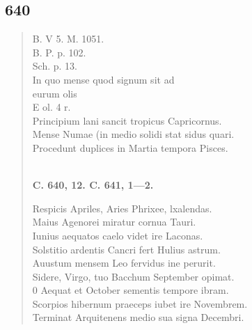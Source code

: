 \documentclass[11pt, a4paper]{report}
\begin{document}
            \subsection*{640}
      \begin{verse}
      B. V 5. M. 1051. \\ B. P. p. 102. \\ Sch. p. 13. \\ In quo mense quod signum sit ad \\ eurum olis \\ E ol. 4 r. \\ Principium lani sancit tropicus Capricornus. \\ Mense Numae (in medio solidi stat sidus quari. \\ Procedunt duplices in Martia tempora Pisces. \\ 
        ﻿\pagebreak 
    \begin{center} \textbf{C. 640, 12. C. 641, 1—2.} \end{center} \marginpar{[107]} Respicis Apriles, Aries Phrixee, lxalendas. \\ Maius Agenorei miratur cornua Tauri. \\ Iunius aequatos caelo videt ire Laconas. \\ Solstitio ardentis Cancri fert Hulius astrum. \\ Auustum mensem Leo fervidus ine perurit. \\ Sidere, Virgo, tuo Bacchum September opimat. \\ 0 Aequat et October sementis tempore ibram. \\ Scorpios hibernum praeceps iubet ire Novembrem. \\ Terminat Arquitenens medio sua signa Decembri. \\ 
      \end{verse}
  
\end{document}
